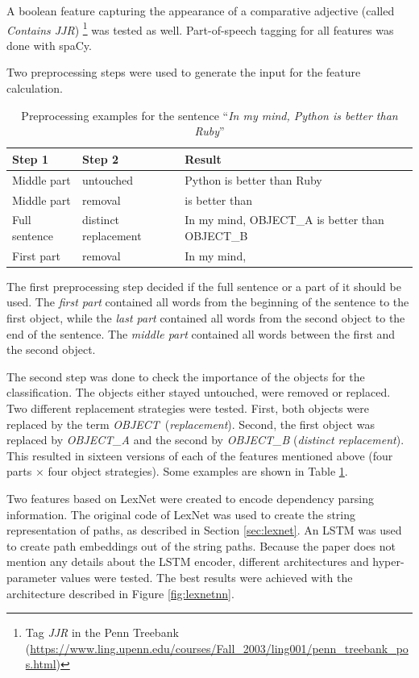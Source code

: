 A boolean feature capturing the appearance of a comparative adjective (called \emph{Contains JJR}) \footnote{Tag \emph{JJR} in the Penn Treebank (\url{https://www.ling.upenn.edu/courses/Fall\_2003/ling001/penn\_treebank\_pos.html})} was tested as well. Part-of-speech tagging for all features was done with spaCy.\newline

Two preprocessing steps were used to generate the input for the feature calculation.
\begin{table}[ht]
\centering

\caption{Preprocessing examples for the sentence \enquote{\emph{In my mind, Python is better than Ruby}}}
\label{preprocessing_example}
\begin{tabularx}{\linewidth}{llX}
\toprule
Step 1 & Step 2 & Result \\ \midrule
Middle part & untouched & Python is better than Ruby \\
Middle part & removal & is better than \\
Full sentence & distinct replacement &In my mind, OBJECT\_A is better than OBJECT\_B \\
First part & removal & In my mind, \\
\bottomrule
\end{tabularx}

\end{table}

The first preprocessing step decided if the full sentence or a part of it should be used. The \emph{first part} contained all words from the beginning of the sentence to the first object, while the \emph{last part} contained all words from the second object to the end of the sentence. The \emph{middle part} contained all words between the first and the second object.

The second step was done to check the importance of the objects for the classification. The objects either stayed untouched, were removed or replaced. Two different replacement strategies were tested. First, both objects were replaced by the term \mbox{\emph{OBJECT} (\emph{replacement})}. Second, the first object was replaced by \emph{OBJECT\_A} and the second by \emph{OBJECT\_B} (\emph{distinct replacement}). This resulted in sixteen versions of each of the features mentioned above (four parts $\times$ four object strategies). Some examples are shown in Table \ref{preprocessing_example}.\newline


\label{sec:lexnet_feat_desc}
Two features based on LexNet were created to encode dependency parsing information. The original code of LexNet was used to create the string representation of paths, as described in Section \ref{sec:lexnet}. An LSTM was used to create path embeddings out of the string paths. Because the paper does not mention any details about the LSTM encoder, different architectures and hyper-parameter values were tested. The best results were achieved with the architecture described in Figure \ref{fig:lexnetnn}.

